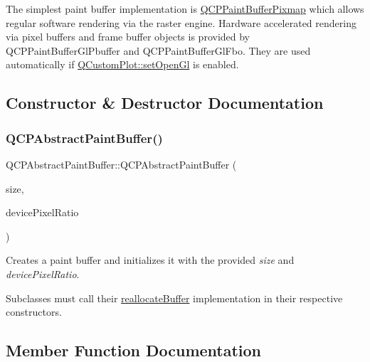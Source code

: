 The simplest paint buffer implementation is \mbox{\hyperlink{class_q_c_p_paint_buffer_pixmap}{Q\+C\+P\+Paint\+Buffer\+Pixmap}} which allows regular software rendering via the raster engine. Hardware accelerated rendering via pixel buffers and frame buffer objects is provided by Q\+C\+P\+Paint\+Buffer\+Gl\+Pbuffer and Q\+C\+P\+Paint\+Buffer\+Gl\+Fbo. They are used automatically if \mbox{\hyperlink{class_q_custom_plot_a7db1adc09016329f3aef7c60da935789}{Q\+Custom\+Plot\+::set\+Open\+Gl}} is enabled. 

\subsection{Constructor \& Destructor Documentation}
\mbox{\label{class_q_c_p_abstract_paint_buffer_a3ce532c12f10b81697108835755641e2}} 
\subsubsection{\texorpdfstring{Q\+C\+P\+Abstract\+Paint\+Buffer()}{QCPAbstractPaintBuffer()}}
{\footnotesize\ttfamily Q\+C\+P\+Abstract\+Paint\+Buffer\+::\+Q\+C\+P\+Abstract\+Paint\+Buffer (\begin{DoxyParamCaption}\item[{const Q\+Size \&}]{size,  }\item[{double}]{device\+Pixel\+Ratio }\end{DoxyParamCaption})\hspace{0.3cm}{\ttfamily [explicit]}}

Creates a paint buffer and initializes it with the provided {\itshape size} and {\itshape device\+Pixel\+Ratio}.

Subclasses must call their \mbox{\hyperlink{class_q_c_p_abstract_paint_buffer_aee7506a52bd7e5a07c2af27935eb13e7}{reallocate\+Buffer}} implementation in their respective constructors. 

\subsection{Member Function Documentation}
\mbox{\label{class_q_c_p_abstract_paint_buffer_a9e253f4541dfc01992b77e8830bd7722}} 
